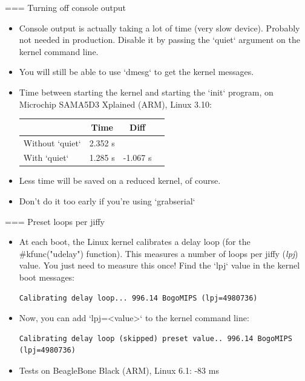 === Turning off console output
\begin{itemize}
\item Console output is actually taking a lot of time (very slow device).
      Probably not needed in production. Disable it by
      passing the `quiet` argument on the kernel command line.
\item You will still be able to use `dmesg` to get the kernel
      messages.
\item Time between starting the kernel and starting the `init`
      program, on Microchip SAMA5D3 Xplained (ARM), Linux 3.10:
      \newline\newline
    \begin{tabular}{| l || c | c | c |}
    \hline
    & Time & Diff \\
    \hline
    Without `quiet` & 2.352 s & \\
    With `quiet` & 1.285 s & -1.067 s\\
    \hline
    \end{tabular}
      \newline
\item Less time will be saved on a reduced kernel, of course.
\item Don't do it too early if you're using `grabserial`
\end{itemize}


=== Preset loops per jiffy
\begin{itemize}
        \item At each boot, the Linux kernel calibrates a delay loop (for
              the #kfunc("udelay") function). This measures a number of loops per
              jiffy ({\em lpj}) value. You just need to measure this once! Find
              the `lpj` value in the kernel boot messages:
\begin{block}{}
\small
\begin{verbatim}
Calibrating delay loop... 996.14 BogoMIPS (lpj=4980736)
\end{verbatim}
\end{block}
        \item Now, you can add `lpj=<value>` to the kernel command
              line:
\begin{block}{}
\small
\begin{verbatim}
Calibrating delay loop (skipped) preset value.. 996.14 BogoMIPS (lpj=4980736)
\end{verbatim}
\end{block}
        \item Tests on BeagleBone Black (ARM), Linux 6.1: -83 ms
\end{itemize}


